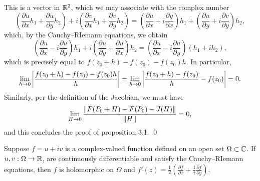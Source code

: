 This is a vector in $\mathbb R^2$, which we may associate with the complex number
\[ \left(\frac{\partial u}{\partial x} h_1 + \frac{\partial u}{\partial y} h_2\right) + i \left(\frac{\partial v}{\partial x} h_1 + \frac{\partial v}{\partial y} h_2\right) = \left(\frac{\partial u}{\partial x} + i \frac{\partial y}{\partial x}\right) h_1 + \left(\frac{\partial u}{\partial y} + i \frac{\partial v}{\partial y}\right) h_2, \]
which, by the Cauchy--RIemann equations, we obtain
\[ \left(\frac{\partial u}{\partial x} - i \frac{\partial u}{\partial y}\right) h_1 + i \left(\frac{\partial u}{\partial y} + \frac{\partial u}{\partial x}\right) h_2 = \left(\frac{\partial u}{\partial x} - i \frac{\partial u}{\partial y}\right)(h_1 + ih_2), \]
which is precisely equal to $f(z_0 + h) - f(z_0) - f(z_0) h$. In particular,
\[ \lim_{h \to 0} \left\lvert \frac{f(z_0 + h) - f(z_0) - f(z_0)h}{h} \right\rvert = \lim_{h \to 0} \left\lvert \frac{f(z_0 + h) - f(z_0)}{h} - f(z_0) \right\rvert = 0. \]
Similarly, per the definition of the Jacobian, we must have
\[ \lim_{H \to 0} \frac{\left\lVert F(P_0 + H) - F(P_0) - J(H) \right\rVert}{\left\lVert H \right\rVert} = 0, \]
and this concludes the proof of proposition 3.1. \qed
\newpage
\begin{theorem}
    Suppose $f = u + iv$ is a complex-valued function defined on an open set $\Omega \subset \mathbb C$. If $u, v : \Omega \to \mathbb R$, are continuously differentiable and satisfy the Cauchy--RIemann equations, then $f$ is holomorphic on $\Omega$ and $f'(z) = \frac{1}{2} \left(\frac{\partial f}{\partial x} + \frac{1}{i} \frac{\partial f}{\partial y}\right)$.
\end{theorem}
